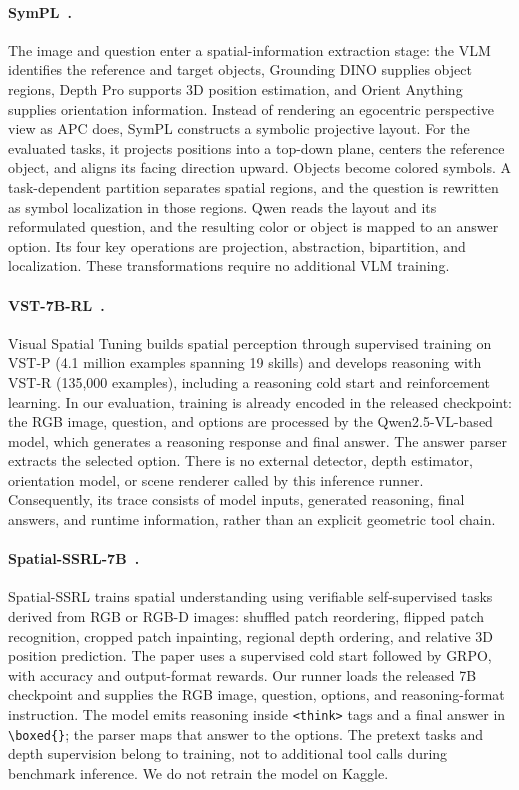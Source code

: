 \documentclass[runningheads]{llncs}
\begin{document}
\paragraph{SymPL~\cite{jang2026sympl}.}
The image and question enter a spatial-information extraction stage: the VLM identifies the reference and target objects, Grounding DINO supplies object regions, Depth Pro supports 3D position estimation, and Orient Anything supplies orientation information. Instead of rendering an egocentric perspective view as APC does, SymPL constructs a symbolic projective layout. For the evaluated tasks, it projects positions into a top-down plane, centers the reference object, and aligns its facing direction upward. Objects become colored symbols. A task-dependent partition separates spatial regions, and the question is rewritten as symbol localization in those regions. Qwen reads the layout and its reformulated question, and the resulting color or object is mapped to an answer option. Its four key operations are projection, abstraction, bipartition, and localization. These transformations require no additional VLM training.

\paragraph{VST-7B-RL~\cite{yang2025vst}.}
Visual Spatial Tuning builds spatial perception through supervised training on VST-P (4.1 million examples spanning 19 skills) and develops reasoning with VST-R (135,000 examples), including a reasoning cold start and reinforcement learning. In our evaluation, training is already encoded in the released checkpoint: the RGB image, question, and options are processed by the Qwen2.5-VL-based model, which generates a reasoning response and final answer. The answer parser extracts the selected option. There is no external detector, depth estimator, orientation model, or scene renderer called by this inference runner. Consequently, its trace consists of model inputs, generated reasoning, final answers, and runtime information, rather than an explicit geometric tool chain.

\paragraph{Spatial-SSRL-7B~\cite{liu2025spatialssrl}.}
Spatial-SSRL trains spatial understanding using verifiable self-supervised tasks derived from RGB or RGB-D images: shuffled patch reordering, flipped patch recognition, cropped patch inpainting, regional depth ordering, and relative 3D position prediction. The paper uses a supervised cold start followed by GRPO, with accuracy and output-format rewards. Our runner loads the released 7B checkpoint and supplies the RGB image, question, options, and reasoning-format instruction. The model emits reasoning inside \texttt{<think>} tags and a final answer in \texttt{\textbackslash boxed\{\}}; the parser maps that answer to the options. The pretext tasks and depth supervision belong to training, not to additional tool calls during benchmark inference. We do not retrain the model on Kaggle.
\end{document}
